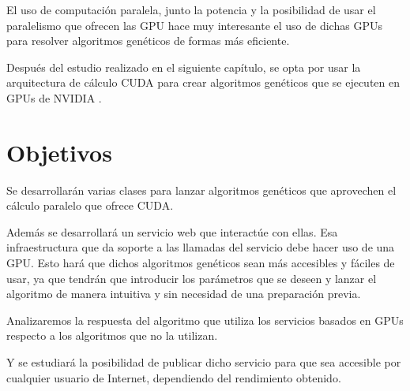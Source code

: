\bigskip
El uso de computación paralela, junto la potencia y la posibilidad de usar el paralelismo que ofrecen las GPU  hace muy interesante el uso de dichas GPUs para resolver algoritmos genéticos de formas más eficiente.

Después del estudio realizado en el siguiente capítulo, se opta por usar la arquitectura de cálculo CUDA \cite{nvidiacuda} para crear algoritmos genéticos que se ejecuten en GPUs de NVIDIA \cite{nvidiadeveloper}.


\bigskip
\section{Objetivos}
\bigskip


Se desarrollarán varias clases para lanzar algoritmos genéticos que aprovechen el cálculo paralelo que ofrece CUDA.

\bigskip
Además se desarrollará un servicio web que interactúe con ellas. Esa infraestructura que da soporte a las llamadas del servicio debe hacer uso de una GPU. Esto hará que dichos algoritmos genéticos sean más accesibles y fáciles de usar, ya que tendrán que introducir los parámetros que se deseen y lanzar el algoritmo de manera intuitiva y sin necesidad de una preparación previa.


\bigskip
Analizaremos la respuesta del algoritmo que utiliza los servicios basados en GPUs respecto a los algoritmos que no la utilizan.

\bigskip 
Y se estudiará la posibilidad de publicar dicho servicio para que sea accesible por cualquier usuario de Internet, dependiendo del rendimiento obtenido.










